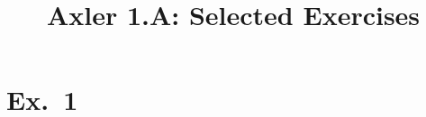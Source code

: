 \documentclass[10pt, a4paper, twocolumn]{article}
\title{Axler 1.A: Selected Exercises}
\date{}
\author{}
\begin{document}
\maketitle
\section*{Ex.~1}
\end{document}
